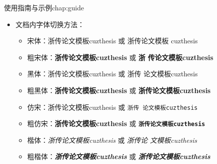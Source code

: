\begin{cuzchapter}{使用指南与示例}{chap:guide}
\begin{itemize}
\begin{itemize}
			      \item 文档超链接的颜色及其显示：修改 \verb|\hypersetup|
		      \end{itemize}
		\item 文档内字体切换方法：
		      \begin{itemize}
			      \item 宋体：浙传论文模板cuzthesis 或 \textrm{浙传论文模板
				            cuzthesis}
			      \item 粗宋体：{\bfseries 浙传论文模板cuzthesis} 或 \textbf{浙
				            传论文模板cuzthesis}
			      \item 黑体：{\sffamily 浙传论文模板cuzthesis} 或 \textsf{浙传
				            论文模板cuzthesis}
			      \item 粗黑体：{\bfseries\sffamily 浙传论文模板cuzthesis} 或
			            \textsf{\bfseries 浙传论文模板cuzthesis}
			      \item 仿宋：{\ttfamily 浙传论文模板cuzthesis} 或 \texttt{浙传
				            论文模板cuzthesis}
			      \item 粗仿宋：{\bfseries\ttfamily 浙传论文模板cuzthesis} 或
			            \texttt{\bfseries 浙传论文模板cuzthesis}
			      \item 楷体：{\itshape 浙传论文模板cuzthesis} 或 \textit{浙传论
				            文模板cuzthesis}
			      \item 粗楷体：{\bfseries\itshape 浙传论文模板cuzthesis} 或
			            \textit{\bfseries 浙传论文模板cuzthesis}
		      \end{itemize}
	\end{itemize}

\end{cuzchapter}
